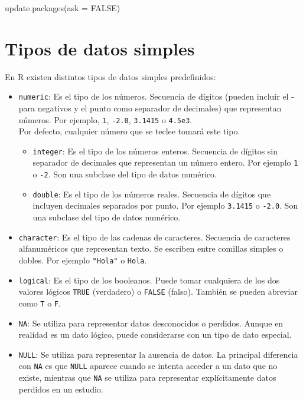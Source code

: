 \documentclass[
  spanish,
  a4paper,
]{scrreport}
\newenvironment{Shaded}{\begin{snugshade}}{\end{snugshade}}
\newcommand{\AttributeTok}[1]{\textcolor[rgb]{0.40,0.45,0.13}{#1}}
\newcommand{\ConstantTok}[1]{\textcolor[rgb]{0.56,0.35,0.01}{#1}}
\newcommand{\FunctionTok}[1]{\textcolor[rgb]{0.28,0.35,0.67}{#1}}
\newcommand{\NormalTok}[1]{\textcolor[rgb]{0.00,0.23,0.31}{#1}}
\theoremstyle{definition}
\theoremstyle{definition}
\theoremstyle{remark}
\begin{document}
\begin{Shaded}
\begin{Highlighting}[]
\FunctionTok{update.packages}\NormalTok{(}\AttributeTok{ask =} \ConstantTok{FALSE}\NormalTok{)}
\end{Highlighting}
\end{Shaded}


\chapter{Tipos de datos simples}\label{tipos-de-datos-simples}

En R existen distintos tipos de datos simples predefinidos:

\begin{itemize}
\item
  \texttt{numeric}: Es el tipo de los números. Secuencia de dígitos
  (pueden incluir el - para negativos y el punto como separador de
  decimales) que representan números. Por ejemplo, \texttt{1},
  \texttt{-2.0}, \texttt{3.1415} o \texttt{4.5e3}.\\
  Por defecto, cualquier número que se teclee tomará este tipo.

  \begin{itemize}
  \item
    \texttt{integer}: Es el tipo de los números enteros. Secuencia de
    dígitos sin separador de decimales que representan un número entero.
    Por ejemplo \texttt{1} o \texttt{-2}. Son una subclase del tipo de
    datos numérico.
  \item
    \texttt{double}: Es el tipo de los números reales. Secuencia de
    dígitos que incluyen decimales separados por punto. Por ejemplo
    \texttt{3.1415} o \texttt{-2.0}. Son una subclase del tipo de datos
    numérico.
  \end{itemize}
\item
  \texttt{character}: Es el tipo de las cadenas de caracteres. Secuencia
  de caracteres alfanuméricos que representan texto. Se escriben entre
  comillas simples o dobles. Por ejemplo \texttt{"Hola"} o
  \texttt{\textquotesingle{}Hola\textquotesingle{}}.
\item
  \texttt{logical}: Es el tipo de los booleanos. Puede tomar cualquiera
  de los dos valores lógicos \texttt{TRUE} (verdadero) o \texttt{FALSE}
  (falso). También se pueden abreviar como \texttt{T} o \texttt{F}.
\item
  \texttt{NA}: Se utiliza para representar datos desconocidos o
  perdidos. Aunque en realidad es un dato lógico, puede considerarse con
  un tipo de dato especial.
\item
  \texttt{NULL}: Se utiliza para representar la ausencia de datos. La
  principal diferencia con \texttt{NA} es que \texttt{NULL} aparece
  cuando se intenta acceder a un dato que no existe, mientras que
  \texttt{NA} se utiliza para representar explícitamente datos perdidos
  en un estudio.
\end{itemize}
\end{document}
